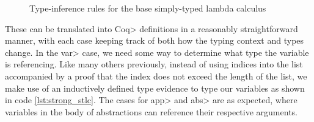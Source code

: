   \begin{figure}
    \caption{Type-inference rules for the base simply-typed lambda calculus}
    \label{fig:base_infer}
  \end{figure}

  These can be translated into \<Coq> definitions in a reasonably straightforward manner, with each case keeping track of both how the typing context and types change.
  In the \<var> case, we need some way to determine what type the variable is referencing.
  Like many others previously\cite{Benton2011}\cite{Coquand1994}, instead of using indices into the list accompanied by a proof that the index does not exceed the length of the list, we make use of an inductively defined type evidence to type our variables as shown in code \cref{lst:strong_stlc}.
  The cases for \<app> and \<abs> are as expected, where variables in the body of abstractions can reference their respective arguments.

